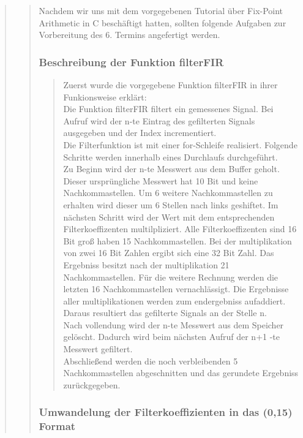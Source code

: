 \begin{quote}
\begin{quote}
    	Nachdem wir uns mit dem vorgegebenen Tutorial über Fix-Point Arithmetic in
    	C beschäftigt hatten, sollten folgende Aufgaben zur Vorbereitung des 6.
    	Termins angefertigt werden.
    	
    	\subsubsection{Beschreibung der Funktion filterFIR}
    	\begin{quote}
    	Zuerst wurde die vorgegebene Funktion filterFIR in ihrer Funkionsweise
    	erklärt:\\ 
    	Die Funktion filterFIR filtert ein gemessenes Signal. Bei Aufruf
    	wird der n-te Eintrag des gefilterten Signals ausgegeben und der Index incrementiert.\\
    	Die Filterfunktion ist mit einer for-Schleife realisiert. Folgende Schritte werden innerhalb eines Durchlaufs
    	durchgeführt.\\
    	Zu Beginn wird der n-te Messwert aus dem Buffer geholt. Dieser ursprüngliche Messwert hat 10 Bit und keine
    	Nachkommastellen. Um 6 weitere Nachkommastellen zu erhalten wird dieser um 6 Stellen nach links geshiftet. Im
        nächsten Schritt wird der Wert mit dem entsprechenden Filterkoeffizenten multilpliziert. Alle Filterkoeffizenten
        sind 16 Bit groß haben 15 Nachkommastellen. Bei der multiplikation von zwei 16 Bit Zahlen ergibt sich eine 32
        Bit Zahl. Das Ergebniss besitzt nach der multiplikation 21 Nachkommastellen. Für die weitere Rechnung werden die
        letzten 16 Nachkommastellen vernachlässigt. Die Ergebnisse aller multiplikationen werden zum endergebniss
        aufaddiert. Daraus resultiert das gefilterte Signals an der Stelle n.\\
        Nach vollendung wird der n-te Messwert aus dem Speicher gelöscht. Dadurch wird beim nächsten Aufruf der n+1 -te
        Messwert gefiltert.\\
        Abschließend werden die noch verbleibenden 5 Nachkommastellen abgeschnitten und das gerundete Ergebniss
        zurückgegeben.
        
		\end{quote}
		
		\subsubsection{Umwandelung der Filterkoeffizienten in das (0,15) Format}
		\begin{quote}
		

\end{quote}
\end{quote}
\end{quote}

